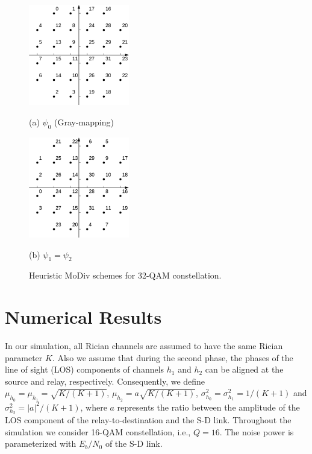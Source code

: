 \documentclass[journal]{IEEEtran}
\begin{document}
\begin{figure}[!t]
    \begin{minipage}[b]{0.48\linewidth}
      \centering
      \centerline{\includegraphics[width=4.4cm]{./figs/gray32.eps}}
      \centerline{(a) $\psi_0$ (Gray-mapping)}\medskip
    \end{minipage}
    \hfill
    \begin{minipage}[b]{0.48\linewidth}
      \centering
      \centerline{\includegraphics[width=4.4cm]{./figs/karim32.eps}}
      \centerline{(b) $\psi_1=\psi_2$}\medskip
    \end{minipage}
    \caption{Heuristic MoDiv schemes for 32-QAM constellation.}
    \label{fig:heuristic32}
\end{figure}

\section{Numerical Results}
\label{sec:simulation}
In our simulation, all Rician channels are assumed to have the same Rician
parameter $K$. Also we assume that during the second phase, the phases of the
line of sight (LOS) components of channels $h_1$ and $h_2$ can be aligned at the
source and relay, respectively.
Consequently, we define $\mu_{h_0} = \mu_{h_1} = \sqrt{K/(K + 1)}$,
$\mu_{h_2}=a\sqrt{K/(K + 1)}$,  $\sigma_{h_0}^2 = \sigma_{h_1}^2 = 1/(K+1)$ and
$\sigma_{h_2}^2 = |a|^2/(K+1)$, where $a$ represents the ratio
between the amplitude of the LOS component of the
relay-to-destination and the S-D link. Throughout the
simulation we consider 16-QAM constellation, i.e.,  $Q=16$. The noise power is
parameterized with $E_b/N_0$ of the S-D link.
\end{document}

